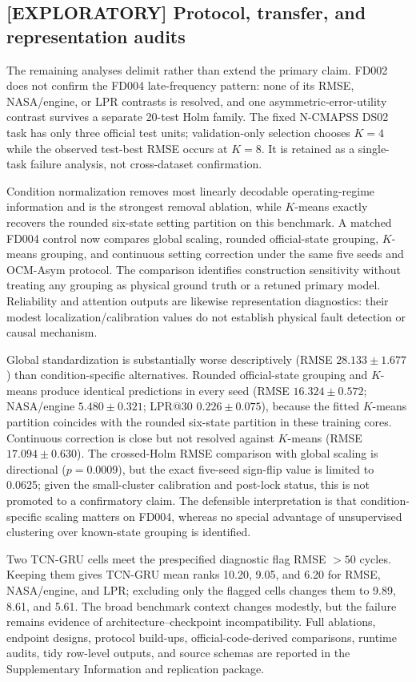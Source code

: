 \subsection{[EXPLORATORY] Protocol, transfer, and representation audits}

The remaining analyses delimit rather than extend the primary claim. FD002 does not confirm the FD004 late-frequency pattern: none of its RMSE, NASA/engine, or LPR contrasts is resolved, and one asymmetric-error-utility contrast survives a separate 20-test Holm family. The fixed N-CMAPSS DS02 task has only three official test units; validation-only selection chooses $K=4$ while the observed test-best RMSE occurs at $K=8$. It is retained as a single-task failure analysis, not cross-dataset confirmation.

Condition normalization removes most linearly decodable operating-regime information and is the strongest removal ablation, while $K$-means exactly recovers the rounded six-state setting partition on this benchmark. A matched FD004 control now compares global scaling, rounded official-state grouping, $K$-means grouping, and continuous setting correction under the same five seeds and OCM-Asym protocol. The comparison identifies construction sensitivity without treating any grouping as physical ground truth or a retuned primary model. Reliability and attention outputs are likewise representation diagnostics: their modest localization/calibration values do not establish physical fault detection or causal mechanism.



Global standardization is substantially worse descriptively (RMSE $28.133\pm1.677$) than condition-specific alternatives. Rounded official-state grouping and $K$-means produce identical predictions in every seed (RMSE $16.324\pm0.572$; NASA/engine $5.480\pm0.321$; LPR@30 $0.226\pm0.075$), because the fitted $K$-means partition coincides with the rounded six-state partition in these training cores. Continuous correction is close but not resolved against $K$-means (RMSE $17.094\pm0.630$). The crossed-Holm RMSE comparison with global scaling is directional ($p=0.0009$), but the exact five-seed sign-flip value is limited to 0.0625; given the small-cluster calibration and post-lock status, this is not promoted to a confirmatory claim. The defensible interpretation is that condition-specific scaling matters on FD004, whereas no special advantage of unsupervised clustering over known-state grouping is identified.

Two TCN-GRU cells meet the prespecified diagnostic flag RMSE $>50$ cycles. Keeping them gives TCN-GRU mean ranks 10.20, 9.05, and 6.20 for RMSE, NASA/engine, and LPR; excluding only the flagged cells changes them to 9.89, 8.61, and 5.61. The broad benchmark context changes modestly, but the failure remains evidence of architecture--checkpoint incompatibility. Full ablations, endpoint designs, protocol build-ups, official-code-derived comparisons, runtime audits, tidy row-level outputs, and source schemas are reported in the Supplementary Information and replication package.
\FloatBarrier
